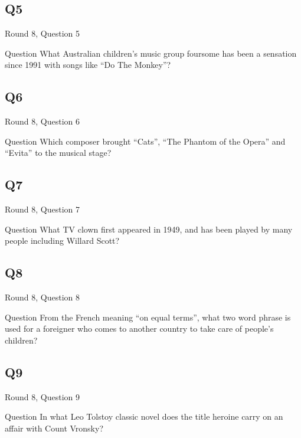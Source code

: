 \documentclass[11pt]{beamer}
\begin{document}
\subsection*{Q5}
\begin{frame}[t]{Round 8, Question 5}
\vspace{2em}
\begin{block}{Question}
What Australian children's music group foursome has been a sensation since 1991 with songs like ``Do The Monkey''\@?
\end{block}
\end{frame}
    

\subsection*{Q6}
\begin{frame}[t]{Round 8, Question 6}
\vspace{2em}
\begin{block}{Question}
Which composer brought ``Cats'', ``The Phantom of the Opera'' and ``Evita'' to the musical stage\@?
\end{block}
\end{frame}
    

\subsection*{Q7}
\begin{frame}[t]{Round 8, Question 7}
\vspace{2em}
\begin{block}{Question}
What TV clown first appeared in 1949, and has been played by many people including Willard Scott\@?
\end{block}
\end{frame}
    

\subsection*{Q8}
\begin{frame}[t]{Round 8, Question 8}
\vspace{2em}
\begin{block}{Question}
From the French meaning ``on equal terms'', what two word phrase is used for a foreigner who comes to another country to take care of people's children\@?
\end{block}
\end{frame}
    

\subsection*{Q9}
\begin{frame}[t]{Round 8, Question 9}
\vspace{2em}
\begin{block}{Question}
In what Leo Tolstoy classic novel does the title heroine carry on an affair with Count Vronsky\@?
\end{block}
\end{frame}
    
\end{document}
